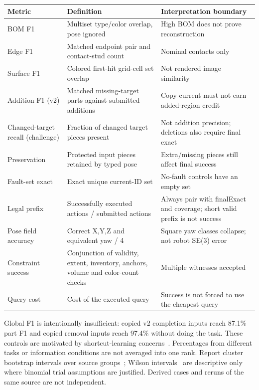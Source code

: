 \begin{tabularx}{\textwidth}{@{}lXX@{}}
\toprule
Metric & Definition & Interpretation boundary\\
\midrule
BOM F1 & Multiset type/color overlap, pose ignored & High BOM does not prove reconstruction\\
Edge F1 & Matched endpoint pair and contact-stud count & Nominal contacts only\\
Surface F1 & Colored first-hit grid-cell set overlap & Not rendered image similarity\\
Addition F1 (v2) & Matched missing-target parts against submitted additions & Copy-current must not earn added-region credit\\
Changed-target recall (challenge) & Fraction of changed target pieces present & Not addition precision; deletions also require final exact\\
Preservation & Protected input pieces retained by typed pose & Extra/missing pieces still affect final success\\
Fault-set exact & Exact unique current-ID set & No-fault controls have an empty set\\
Legal prefix & Successfully executed actions / submitted actions & Always pair with finalExact and coverage; short valid prefix is not success\\
Pose field accuracy & Correct X,Y,Z and equivalent yaw / 4 & Square yaw classes collapse; not robot SE(3) error\\
Constraint success & Conjunction of validity, extent, inventory, anchors, volume and color-count checks & Multiple witnesses accepted\\
Query cost & Cost of the executed query & Success is not forced to use the cheapest query\\
\bottomrule
\end{tabularx}

Global F1 is intentionally insufficient: copied v2 completion inputs reach 87.1\%
part F1 and copied removal inputs reach 97.4\% without doing the task.
These controls are motivated by shortcut-learning concerns~\cite{geirhos2020shortcut}.
Percentages from different tasks or information conditions are not averaged into one rank.
Report cluster bootstrap intervals over source groups~\cite{efron1979bootstrap};
Wilson intervals~\cite{wilson1927} are descriptive only where binomial trial
assumptions are justified. Derived cases and reruns of the same source are not independent.

